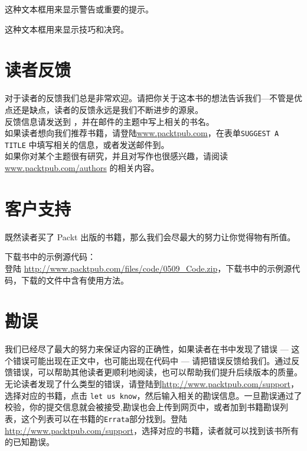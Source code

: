 \begin{warning}
这种文本框用来显示警告或重要的提示。\\
\end{warning}

\begin{tips}
这种文本框用来显示技巧和决窍。\\
\end{tips}

\section*{读者反馈}
\label{sec:reader_feedback}
对于读者的反馈我们总是非常欢迎。请把你关于这本书的想法告诉我们---不管是优点还是缺点，读者的反馈永远是我们不断进步的源泉。\\

反馈信息请发送到 ，并在邮件的主题中写上相关的书名。\\

如果读者想向我们推荐书籍，请登陆\url{www.packtpub.com}，在表单\texttt{SUGGEST A TITLE} 中填写相关的信息，或者发送邮件到。\\

如果你对某个主题很有研究，并且对写作也很感兴趣，请阅读\url{www.packtpub.com/authors} 的相关内容。\\

\section*{客户支持}
\label{sec:customer_support}既然读者买了 Packt 出版的书籍，那么我们会尽最大的努力让你觉得物有所值。\\
\begin{warning}
    下载书中的示例源代码：\\

    登陆 \url{http://www.packtpub.com/files/code/0509_Code.zip}，下载书中的示例源代码，下载的文件中含有使用方法。\\
\end{warning}

\section*{勘误}
\label{sec:errata}

我们已经尽了最大的努力来保证内容的正确性，如果读者在书中发现了错误 --- 这个错误可能出现在正文中，也可能出现在代码中 --- 请把错误反馈给我们。通过反馈错误，可以帮助其他读者更顺利地阅读，也可以帮助我们提升后续版本的质量。无论读者发现了什么类型的错误，请登陆到\url{http://www.packtpub.com/support}，选择对应的书籍，点击 \texttt{let us
know}，然后输入相关的勘误信息。一旦勘误通过了校验，你的提交信息就会被接受,勘误也会上传到网页中，或者加到书籍勘误列表，这个列表可以在书籍的\texttt{Errata}部分找到。登陆\url{http://www.packtpub.com/support}，选择对应的书籍，读者就可以找到该书所有的已知勘误。\\

